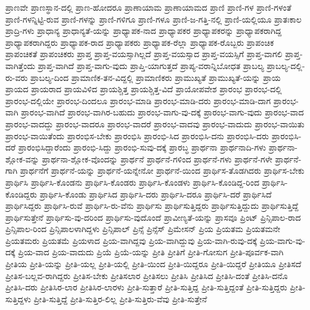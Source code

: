 {ಪ್ರಾಣವೇ
ಪ್ರಾಣಸ್ಥಾನ-ದಲ್ಲಿ
ಪ್ರಾಣ-ಹೋದರೂ
ಪ್ರಾಣಾಯಾಮ
ಪ್ರಾಣಾಯಾಮದ
ಪ್ರಾಣಿ
ಪ್ರಾಣಿ-ಗಳ
ಪ್ರಾಣಿ-ಗಳಂತೆ
ಪ್ರಾಣಿ-ಗಳನ್ನಿಟ್ಟಿ-ರುವ
ಪ್ರಾಣಿ-ಗಳನ್ನು
ಪ್ರಾಣಿ-ಗಳಿಗೂ
ಪ್ರಾಣಿ-ಗಳೂ
ಪ್ರಾಣಿ-ಜ-ಗತ್ತಿ-ನಲ್ಲಿ
ಪ್ರಾಣಿ-ಯಲ್ಲಿಯೂ
ಪ್ರಾತಃಕಾಲ
ಪ್ರಾದ್ರಿ-ಗಳು
ಪ್ರಾಧಾನ್ಯ
ಪ್ರಾಧಾನ್ಯತೆ-ಯನ್ನು
ಪ್ರಾಧ್ಯಾಪಕ-ನಾದ
ಪ್ರಾಧ್ಯಾಪಕರ
ಪ್ರಾಧ್ಯಾಪಕರನ್ನು
ಪ್ರಾಧ್ಯಾಪಕರಾಗಿದ್ದ
ಪ್ರಾಧ್ಯಾಪಕರಾಗಿದ್ದರು
ಪ್ರಾಧ್ಯಾಪಕ-ರಾದ
ಪ್ರಾಧ್ಯಾಪಕರು
ಪ್ರಾಧ್ಯಾಪಕ-ರೆಲ್ಲಾ
ಪ್ರಾಧ್ಯಾಪಕ-ರೊಬ್ಬರು
ಪ್ರಾಪಂಚಿಕ
ಪ್ರಾಪಂಚಿಕತೆ
ಪ್ರಾಪಂಚಿಕರು
ಪ್ರಾಪ್ತ
ಪ್ರಾಪ್ತ-ವಯಸ್ಸಾಗಿಲ್ಲದೆ
ಪ್ರಾಪ್ತ-ವಯಸ್ಸಾದ
ಪ್ರಾಪ್ತ-ವಯಸ್ಸಿಗೆ
ಪ್ರಾಪ್ತ-ವಾಗಲಿ
ಪ್ರಾಪ್ತ-ವಾಗಿತ್ತೆಂದು
ಪ್ರಾಪ್ತ-ವಾಗಿದೆ
ಪ್ರಾಪ್ತ-ವಾಗು-ವುದು
ಪ್ರಾಪ್ತಿ-ಯಾಗುತ್ತದೆ
ಪ್ರಾಪ್ಯ-ವರಾನ್ನಿಬೋಧತ
ಪ್ರಾಬಲ್ಯ
ಪ್ರಾಬಲ್ಯ-ದಲ್ಲಿ-ರು-ವರು
ಪ್ರಾಬಲ್ಯ-ದಿಂದ
ಪ್ರಾಮಾಣಿಕ-ತನ-ವಿದ್ದಲ್ಲಿ
ಪ್ರಾಮಾಣಿಕರು
ಪ್ರಾಮುಖ್ಯತೆ
ಪ್ರಾಮುಖ್ಯತೆ-ಯನ್ನು
ಪ್ರಾಯ
ಪ್ರಾಯದ
ಪ್ರಾಯರಾದ
ಪ್ರಾಯವಿಳಿದ
ಪ್ರಾಯಶ್ಚಿತ್ತ
ಪ್ರಾಯಶ್ಚಿತ್ತ-ವಿದೆ
ಪ್ರಾಯೋಪವೇಶ
ಪ್ರಾರಂಭ
ಪ್ರಾರಂಭ-ದಲ್ಲಿ
ಪ್ರಾರಂಭ-ದಲ್ಲಿಯೇ
ಪ್ರಾರಂಭ-ದಿಂದಲೂ
ಪ್ರಾರಂಭ-ಮಾಡಿ
ಪ್ರಾರಂಭ-ಮಾಡಿ-ದರು
ಪ್ರಾರಂಭ-ಮಾಡಿ-ದಾಗ
ಪ್ರಾರಂಭ-ವಾಗಿ
ಪ್ರಾರಂಭ-ವಾಗಿದೆ
ಪ್ರಾರಂಭ-ವಾಗಿರ-ಬಹುದು
ಪ್ರಾರಂಭ-ವಾಗು-ವು-ದಕ್ಕೆ
ಪ್ರಾರಂಭ-ವಾಗು-ವುದು
ಪ್ರಾರಂಭ-ವಾದ
ಪ್ರಾರಂಭ-ವಾದದ್ದು
ಪ್ರಾರಂಭ-ವಾದರೂ
ಪ್ರಾರಂಭ-ವಾದರೆ
ಪ್ರಾರಂಭ-ವಾದವು
ಪ್ರಾರಂಭ-ವಾದುದು
ಪ್ರಾರಂಭ-ವಾಯಿತು
ಪ್ರಾರಂಭ-ವಾಯಿತೆಂದು
ಪ್ರಾರಂಭಿಸ-ಬೇಕು
ಪ್ರಾರಂಭಿಸಿ
ಪ್ರಾರಂಭಿ-ಸಿದ
ಪ್ರಾರಂಭಿಸಿ-ದನು
ಪ್ರಾರಂಭಿಸಿ-ದರು
ಪ್ರಾರಂಭಿಸಿ-ದರೆ
ಪ್ರಾರಂಭಿಸಿದ್ದಾರೆಂದು
ಪ್ರಾರಂಭಿ-ಸಿದ್ದು
ಪ್ರಾರಂಭಿ-ಸುವು-ದಕ್ಕೆ
ಪ್ರಾರಬ್ಧ
ಪ್ರಾರ್ಥನಾ
ಪ್ರಾರ್ಥನಾದಿ-ಗಳು
ಪ್ರಾರ್ಥನಾ-ಶ್ಲೋಕ-ವನ್ನು
ಪ್ರಾರ್ಥನಾ-ಶ್ಲೋಕ-ವೊಂದನ್ನು
ಪ್ರಾರ್ಥನೆ
ಪ್ರಾರ್ಥನೆ-ಗಳಿಂದ
ಪ್ರಾರ್ಥನೆ-ಗಳು
ಪ್ರಾರ್ಥನೆ-ಗಳೇ
ಪ್ರಾರ್ಥನೆ-ಗಾಗಿ
ಪ್ರಾರ್ಥನೆಗೆ
ಪ್ರಾರ್ಥನೆ-ಯನ್ನು
ಪ್ರಾರ್ಥನೆ-ಯನ್ನೇನೋ
ಪ್ರಾರ್ಥನೆ-ಯಿಂದ
ಪ್ರಾರ್ಥಿಸ-ತೊಡಗಿದರು
ಪ್ರಾರ್ಥಿಸ-ಬೇಕು
ಪ್ರಾರ್ಥಿಸಿ
ಪ್ರಾರ್ಥಿಸಿ-ಕೊಂಡನು
ಪ್ರಾರ್ಥಿಸಿ-ಕೊಂಡರು
ಪ್ರಾರ್ಥಿಸಿ-ಕೊಂಡಳು
ಪ್ರಾರ್ಥಿಸಿ-ಕೊಂಡಿದ್ದ-ರಿಂದ
ಪ್ರಾರ್ಥಿಸಿ-ಕೊಂಡಿದ್ದರು
ಪ್ರಾರ್ಥಿಸಿ-ಕೊಂಡು
ಪ್ರಾರ್ಥಿಸಿದ
ಪ್ರಾರ್ಥಿಸಿ-ದರು
ಪ್ರಾರ್ಥಿಸಿ-ದರೂ
ಪ್ರಾರ್ಥಿಸಿ-ದರೆ
ಪ್ರಾರ್ಥಿಸಿದೆ
ಪ್ರಾರ್ಥಿಸಿದ್ದರು
ಪ್ರಾರ್ಥಿಸಿ-ರುವೆ
ಪ್ರಾರ್ಥಿಸಿ-ರು-ವೆನು
ಪ್ರಾರ್ಥಿಸು
ಪ್ರಾರ್ಥಿಸುತ್ತಿದ್ದರು
ಪ್ರಾರ್ಥಿಸುತ್ತಿದ್ದುದು
ಪ್ರಾರ್ಥಿಸುತ್ತಿದ್ದೆ
ಪ್ರಾರ್ಥಿಸುತ್ತೇನೆ
ಪ್ರಾರ್ಥಿಸು-ವು-ದರಿಂದ
ಪ್ರಾರ್ಥಿಸು-ವುದೊಂದೆ
ಪ್ರಾವೀಣ್ಯತೆ-ಯನ್ನು
ಪ್ರಾಸವೂ
ಪ್ರಿಂಟ್
ಪ್ರಿನ್ಸಿಪಾಲ-ರಾದ
ಪ್ರಿನ್ಸಿಪಾಲ-ರಿಂದ
ಪ್ರಿನ್ಸಿಪಾಲಳಾಗಿದ್ದಳು
ಪ್ರಿನ್ಸಿಪಾಲ್
ಪ್ರಿನ್ಸೆ
ಪ್ರಿನ್ಸೆಸ್
ಪ್ರಿಮೇಸನ್
ಪ್ರಿಯ
ಪ್ರಿಯತಮ
ಪ್ರಿಯತಮನೇ
ಪ್ರಿಯತಮರು
ಪ್ರಿಯತಮೆ
ಪ್ರಿಯಳಾದ
ಪ್ರಿಯ-ವಾಗಿದ್ದವು
ಪ್ರಿಯ-ವಾಗಿದ್ದುವು
ಪ್ರಿಯ-ವಾಗಿ-ರುವು-ದಕ್ಕೆ
ಪ್ರಿಯ-ವಾಗು-ವು-ದಕ್ಕೆ
ಪ್ರಿಯ-ವಾದ
ಪ್ರಿಯ-ವಾದುದು
ಪ್ರಿಯೆ
ಪ್ರಿಯೆ-ಯನ್ನು
ಪ್ರೀತಿ
ಪ್ರೀತಿಗೆ
ಪ್ರೀತಿ-ಗೋಸುಗ
ಪ್ರೀತಿ-ಪೂರ್ವಕ-ವಾಗಿ
ಪ್ರೀತಿಯ
ಪ್ರೀತಿ-ಯನ್ನು
ಪ್ರೀತಿ-ಯಲ್ಲ
ಪ್ರೀತಿ-ಯಲ್ಲಿ
ಪ್ರೀತಿ-ಯಿಂದ
ಪ್ರೀತಿ-ಯಿದ್ದರೂ
ಪ್ರೀತಿ-ಯಿದ್ದರೆ
ಪ್ರೀತಿಯೂ
ಪ್ರೀತಿಸದೆ
ಪ್ರೀತಿಸ-ಬಲ್ಲವ-ರಾಗಿದ್ದರು
ಪ್ರೀತಿಸ-ಬೇಕು
ಪ್ರೀತಿಸಲಾರ
ಪ್ರೀತಿಸಲು
ಪ್ರೀತಿಸಿ
ಪ್ರೀತಿಸಿದ
ಪ್ರೀತಿಸಿ-ದಂತೆ
ಪ್ರೀತಿಸಿ-ದನೊ
ಪ್ರೀತಿಸಿ-ದರು
ಪ್ರೀತಿಸಿರ-ಲಾರ
ಪ್ರೀತಿಸಿರ-ಲಾರಳು
ಪ್ರೀತಿ-ಸುತ್ತಾರೆ
ಪ್ರೀತಿ-ಸುತ್ತಿದ್ದ
ಪ್ರೀತಿ-ಸುತ್ತಿದ್ದಂತೆ
ಪ್ರೀತಿ-ಸುತ್ತಿದ್ದರು
ಪ್ರೀತಿ-ಸುತ್ತಿದ್ದಳು
ಪ್ರೀತಿ-ಸುತ್ತಿದ್ದೆ
ಪ್ರೀತಿ-ಸುತ್ತಿರ-ಲಿಲ್ಲ
ಪ್ರೀತಿ-ಸುತ್ತಿರು-ವೆವು
ಪ್ರೀತಿ-ಸುತ್ತೇನೆ
}
